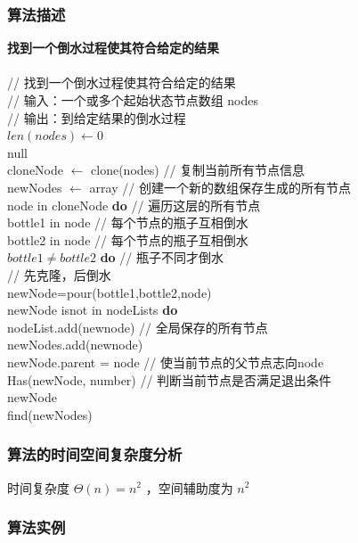 \documentclass{ctexart}
\newcommand\tab[1][1cm]{\hspace*{#1}}
\begin{document}
\subsubsection{算法描述 }
   {\bfseries 找到一个倒水过程使其符合给定的结果} \\
   \tab{\bfseries{算法 find $(nodes)$ }} \\
	\tab// 找到一个倒水过程使其符合给定的结果\\
	\tab// 输入：一个或多个起始状态节点数组 nodes \\
	\tab// 输出：到给定结果的倒水过程\\
	\tab{\bfseries if} $len(nodes) \leftarrow 0$ \\
	\tab\tab{\bfseries return} null \\
	\tab cloneNode $\leftarrow$ clone(nodes) // 复制当前所有节点信息 \\
	\tab newNodes $\leftarrow$ array // 创建一个新的数组保存生成的所有节点 \\
	\tab{\bfseries for} node in cloneNode {\bfseries do} // 遍历这层的所有节点 \\
	\tab\tab{\bfseries for} bottle1 in node // 每个节点的瓶子互相倒水 \\
	\tab\tab{\bfseries for} bottle2 in node // 每个节点的瓶子互相倒水 \\
	\tab\tab\tab{\bfseries if} $bottle1 \ne bottle2$ {\bfseries do} // 瓶子不同才倒水\\
	\tab\tab\tab// 先克隆，后倒水				\\
	\tab\tab\tab newNode=pour(bottle1,bottle2,node) \\
	\tab\tab\tab{\bfseries if} newNode isnot in nodeLists {\bfseries do} \\
	\tab\tab\tab\tab nodeList.add(newnode) // 全局保存的所有节点\\
	\tab\tab\tab\tab newNodes.add(newnode) \\
	\tab\tab\tab\tab newNode.parent = node // 使当前节点的父节点志向node\\
	\tab\tab\tab{\bfseries if} Has(newNode, number) // 判断当前节点是否满足退出条件 \\
	\tab\tab\tab\tab{\bfseries return} newNode \\
	\tab find(newNodes)
\subsubsection{算法的时间空间复杂度分析 }
时间复杂度 $\Theta(n) = n^2$ ，空间辅助度为 $n^2$
\subsubsection{算法实例}
\end{document}

